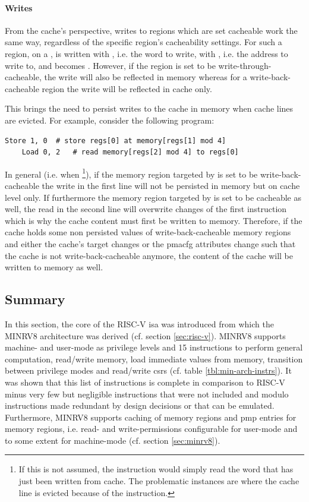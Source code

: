 \paragraph{Writes}
From the cache's perspective, writes to regions which are set cacheable work the same way, regardless of the specific region's cacheability settings.
For such a region, on a ,  is written with , i.e. the word to write,  with , i.e. the address to write to, and  becomes .
However, if the region is set to be write-through-cacheable, the write will also be reflected in memory whereas for a write-back-cacheable region the write will be reflected in cache only.

This brings the need to persist writes to the cache in memory when cache lines are evicted.
For example, consider the following program:
\begin{lstlisting}[language=minrv8]
    Store 1, 0  # store regs[0] at memory[regs[1] mod 4]
    Load 0, 2   # read memory[regs[2] mod 4] to regs[0]
\end{lstlisting}

In general (i.e. when \footnote{%
    If this is not assumed, the  instruction would simply read the word that has just been written from cache.
    The problematic instances are where the cache line is evicted because of the  instruction.
}), if the memory region targeted by  is set to be write-back-cacheable the write in the first line will not be persisted in memory but on cache level only.
If furthermore the memory region targeted by  is set to be cacheable as well, the read in the second line will overwrite changes of the first instruction which is why the cache content must first be written to memory.
Therefore, if the cache holds some non persisted values of write-back-cacheable memory regions and either the cache's target changes or the \gls{pmacfg} attributes change such that the cache is not write-back-cacheable anymore, the content of the cache will be written to memory as well.

\subsection{Summary}
\label{sec:arch-summary}

In this section, the core of the RISC-V \gls{isa} was introduced from which the MINRV8 architecture was derived (cf. section \ref{sec:risc-v}).
MINRV8 supports machine- and user-mode as privilege levels and 15 instructions to perform general computation, read/write memory, load immediate values from memory, transition between privilege modes and read/write \glspl{csr} (cf. table \ref{tbl:min-arch-instrs}).
It was shown that this list of instructions is complete in comparison to RISC-V minus very few but negligible instructions that were not included and modulo instructions made redundant by design decisions or that can be emulated.
Furthermore, MINRV8 supports caching of memory regions and \gls{pmp} entries for memory regions, i.e. read- and write-permissions configurable for user-mode and to some extent for machine-mode (cf. section \ref{sec:minrv8}).


